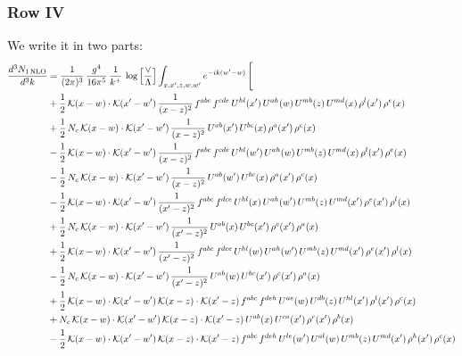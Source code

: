 \documentclass[9pt]{article}
\numberwithin{equation}{section}
\begin{document}
\subsubsection{Row IV}
We write it in two parts: 
\begin{align}
\frac{d^{3}N_{1\,\mathrm{NLO}}}{d^{3}k} & = \frac{1}{(2\pi)^{3}}\,\frac{g^{4}}{16\pi^{5}}\,\frac{1}{k^{+}}\,\log\Big[\frac{\vee}{\Lambda}\Big]\int_{x,x',z,w,w'}e^{-ik(w'-w)}\,\Bigg[\notag\\ & 
 +\frac{1}{2}\,\mathcal{K}(x-w)\cdot\mathcal{K}(x'-w')\,\frac{1}{(x-z)^{2}}\,f^{abc}\,f^{cde}\,U^{hl}(x')\,U^{ah}(w)\,U^{mb}(z)\,U^{md}(x)\,\rho^{l}(x')\,\rho^{e}(x)\notag\\
& +\frac{1}{2}\,N_{c}\,\mathcal{K}(x-w)\cdot\mathcal{K}(x'-w')\,\frac{1}{(x-z)^{2}}\,U^{ab}(x')\,U^{bc}(x)\,\rho^{a}(x')\,\rho^{c}(x)\notag\\
& -\frac{1}{2}\,\mathcal{K}(x-w)\cdot\mathcal{K}(x'-w')\,\frac{1}{(x-z)^{2}}\,f^{abc}\,f^{cde}\,U^{hl}(w')\,U^{ah}(w)\,U^{mb}(z)\,U^{md}(x)\,\rho^{l}(x')\,\rho^{e}(x)\notag\\
& -\frac{1}{2}\,N_{c}\,\mathcal{K}(x-w)\cdot\mathcal{K}(x'-w')\,\frac{1}{(x-z)^{2}}\,U^{ab}(w')\,U^{bc}(x)\,\rho^{a}(x')\,\rho^{c}(x)\notag\\
& -\frac{1}{2}\,\mathcal{K}(x-w)\cdot\mathcal{K}(x'-w')\,\frac{1}{(x'-z)^{2}}\,f^{abc}\,f^{dce}\,U^{hl}(x)\,U^{ah}(w')\,U^{mb}(z)\,U^{md}(x')\,\rho^{e}(x')\,\rho^{l}(x)\notag\\
& +\frac{1}{2}\,N_{c}\,\mathcal{K}(x-w)\cdot\mathcal{K}(x'-w')\,\frac{1}{(x'-z)^{2}}\,U^{ab}(x)\,U^{bc}(x')\,\rho^{c}(x')\,\rho^{a}(x)\notag\\
& +\frac{1}{2}\,\mathcal{K}(x-w)\cdot\mathcal{K}(x'-w')\,\frac{1}{(x'-z)^{2}}\,f^{abc}\,f^{dce}\,U^{hl}(w)\,U^{ah}(w')\,U^{mb}(z)\,U^{md}(x')\,\rho^{e}(x')\,\rho^{l}(x)\notag\\
& -\frac{1}{2}\,N_{c}\,\mathcal{K}(x-w)\cdot\mathcal{K}(x'-w')\,\frac{1}{(x'-z)^{2}}\,U^{ab}(w)\,U^{bc}(x')\,\rho^{c}(x')\,\rho^{a}(x)\notag\\
& +\frac{1}{2}\,\mathcal{K}(x-w)\cdot\mathcal{K}(x'-w')\,\mathcal{K}(x-z)\cdot\mathcal{K}(x'-z)\,f^{abc}\,f^{deh}\,U^{ae}(w)\,U^{db}(z)\,U^{hl}(x')\,\rho^{l}(x')\,\rho^{c}(x)\notag\\
& +N_{c}\,\mathcal{K}(x-w)\cdot\mathcal{K}(x'-w')\,\mathcal{K}(x-z)\cdot\mathcal{K}(x'-z)\,U^{ab}(x)\,U^{ca}(x')\,\rho^{c}(x')\,\rho^{b}(x)\notag\\
& -\frac{1}{2}\,\mathcal{K}(x-w)\cdot\mathcal{K}(x'-w')\,\mathcal{K}(x-z)\cdot\mathcal{K}(x'-z)\,f^{abc}\,f^{deh}\,U^{le}(w')\,U^{al}(w)\,U^{mb}(z)\,U^{md}(x')\,\rho^{h}(x')\,\rho^{c}(x)\notag\\

\end{align}
\end{document}
